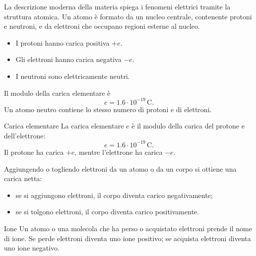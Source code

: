 \documentclass[a4paper]{article}
\begin{document}
La descrizione moderna della materia spiega i fenomeni elettrici tramite la struttura atomica. Un atomo è formato da un nucleo centrale, contenente protoni e neutroni, e da elettroni che occupano regioni esterne al nucleo.

\begin{itemize}
    \item I protoni hanno carica positiva \(+e\).
    \item Gli elettroni hanno carica negativa \(-e\).
    \item I neutroni sono elettricamente neutri.
\end{itemize}

Il modulo della carica elementare è
\[
    e=1.6\cdot 10^{-19}\,\mathrm{C}.
\]
Un atomo neutro contiene lo stesso numero di protoni e di elettroni.

\begin{snippetdefinition}{Carica elementare}
    La carica elementare \(e\) è il modulo della carica del protone e dell'elettrone:
    \[
        e=1.6\cdot10^{-19}\,\mathrm{C}.
    \]
    Il protone ha carica \(+e\), mentre l'elettrone ha carica \(-e\).
\end{snippetdefinition}

\begin{center}
\end{center}

Aggiungendo o togliendo elettroni da un atomo o da un corpo si ottiene una carica netta:
\begin{itemize}
    \item se si aggiungono elettroni, il corpo diventa carico negativamente;
    \item se si tolgono elettroni, il corpo diventa carico positivamente.
\end{itemize}

\begin{snippetdefinition}{Ione}
    Un atomo o una molecola che ha perso o acquistato elettroni prende il nome di ione. Se perde elettroni diventa uno ione positivo; se acquista elettroni diventa uno ione negativo.
\end{snippetdefinition}
\end{document}
